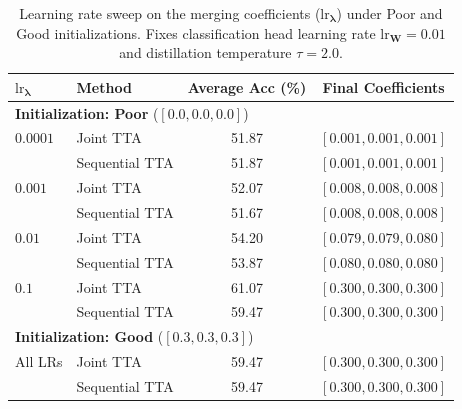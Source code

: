 \documentclass{article}
\theoremstyle{plain}
\theoremstyle{definition}
\theoremstyle{remark}
\begin{document}
\begin{table}[t]
\caption{Learning rate sweep on the merging coefficients ($\text{lr}_{\boldsymbol{\lambda}}$) under Poor and Good initializations. Fixes classification head learning rate $\text{lr}_{\mathbf{W}} = 0.01$ and distillation temperature $\tau = 2.0$.}
\label{tab:lr_sweep}
\vskip 0.08in
\begin{center}
\begin{small}
\begin{sc}
\begin{tabular}{llcc}
\toprule
$\text{lr}_{\boldsymbol{\lambda}}$ & Method & Average Acc (\%) & Final Coefficients \\
\midrule
\multicolumn{4}{l}{\textbf{Initialization: Poor} ($[0.0, 0.0, 0.0]$)} \\
\midrule
$0.0001$ & Joint TTA      & 51.87 & $[0.001, 0.001, 0.001]$ \\
         & Sequential TTA & 51.87 & $[0.001, 0.001, 0.001]$ \\
\midrule
$0.001$  & Joint TTA      & 52.07 & $[0.008, 0.008, 0.008]$ \\
         & Sequential TTA & 51.67 & $[0.008, 0.008, 0.008]$ \\
\midrule
$0.01$   & Joint TTA      & 54.20 & $[0.079, 0.079, 0.080]$ \\
         & Sequential TTA & 53.87 & $[0.080, 0.080, 0.080]$ \\
\midrule
$0.1$    & Joint TTA      & 61.07 & $[0.300, 0.300, 0.300]$ \\
         & Sequential TTA & 59.47 & $[0.300, 0.300, 0.300]$ \\
\midrule
\multicolumn{4}{l}{\textbf{Initialization: Good} ($[0.3, 0.3, 0.3]$)} \\
\midrule
All LRs  & Joint TTA      & 59.47 & $[0.300, 0.300, 0.300]$ \\
         & Sequential TTA & 59.47 & $[0.300, 0.300, 0.300]$ \\
\bottomrule
\end{tabular}
\end{sc}
\end{small}
\end{center}
\vskip -0.1in
\end{table}
\end{document}
